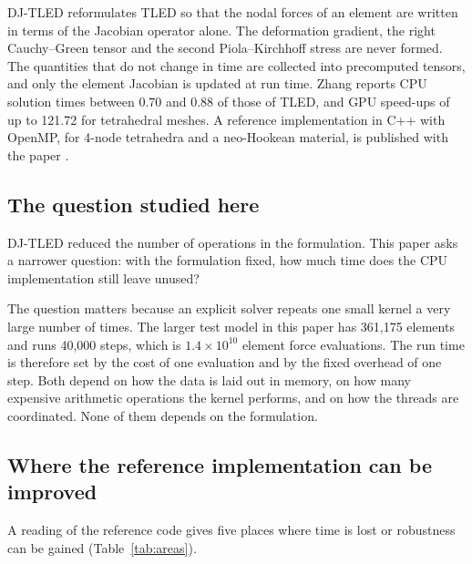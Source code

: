 \documentclass[11pt,a4paper]{article}
\begin{document}
DJ-TLED \cite{zhang2021} reformulates TLED so that the nodal forces of an element are written in terms of the Jacobian operator alone. The deformation gradient, the right Cauchy--Green tensor and the second Piola--Kirchhoff stress are never formed. The quantities that do not change in time are collected into precomputed tensors, and only the element Jacobian is updated at run time. Zhang \cite{zhang2021} reports CPU solution times between 0.70 and 0.88 of those of TLED, and GPU speed-ups of up to 121.72 for tetrahedral meshes. A reference implementation in C++ with OpenMP, for 4-node tetrahedra and a neo-Hookean material, is published with the paper \cite{djtledcode}.

\subsection{The question studied here}

DJ-TLED reduced the number of operations in the formulation. This paper asks a narrower question: with the formulation fixed, how much time does the CPU implementation still leave unused?

The question matters because an explicit solver repeats one small kernel a very large number of times. The larger test model in this paper has 361,175 elements and runs 40,000 steps, which is $1.4\times10^{10}$ element force evaluations. The run time is therefore set by the cost of one evaluation and by the fixed overhead of one step. Both depend on how the data is laid out in memory, on how many expensive arithmetic operations the kernel performs, and on how the threads are coordinated. None of them depends on the formulation.

\subsection{Where the reference implementation can be improved}

A reading of the reference code \cite{djtledcode} gives five places where time is lost or robustness can be gained (Table~\ref{tab:areas}).
\end{document}
